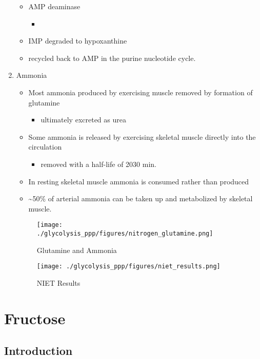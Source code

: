 \documentclass{scrartcl}
\begin{document}
\begin{enumerate}
\begin{itemize}
\item AMP deaminase
\begin{itemize}
\item {}
\end{itemize}

\item IMP degraded to hypoxanthine
\item recycled back to AMP in the purine nucleotide cycle.
\end{itemize}

\item Ammonia
\label{sec:org1c3dfc1}
\begin{itemize}
\item Most ammonia produced by exercising muscle removed by formation of glutamine
\begin{itemize}
\item ultimately excreted as urea
\end{itemize}
\item Some ammonia is released by exercising skeletal muscle directly into the circulation
\begin{itemize}
\item removed with a half-life of 20\textpm{}30 min.
\end{itemize}
\item In resting skeletal muscle ammonia is consumed rather than produced
\item \textasciitilde{}50\% of arterial ammonia can be taken up and metabolized by skeletal muscle.
\end{itemize}

\begin{figure}[htbp]
\centering
\texttt{[image: ./glycolysis\_ppp/figures/nitrogen\_glutamine.png]}
\caption[gln]{\label{fig:org42f47f3}
Glutamine and Ammonia}
\end{figure}

\begin{figure}[htbp]
\centering
\texttt{[image: ./glycolysis\_ppp/figures/niet\_results.png]}
\caption[interp]{\label{fig:org5dbee24}
NIET Results}
\end{figure}
\end{enumerate}
\section{Fructose}
\label{sec:org80848f1}
\subsection{Introduction}
\label{sec:org4cda3df}
\end{document}
